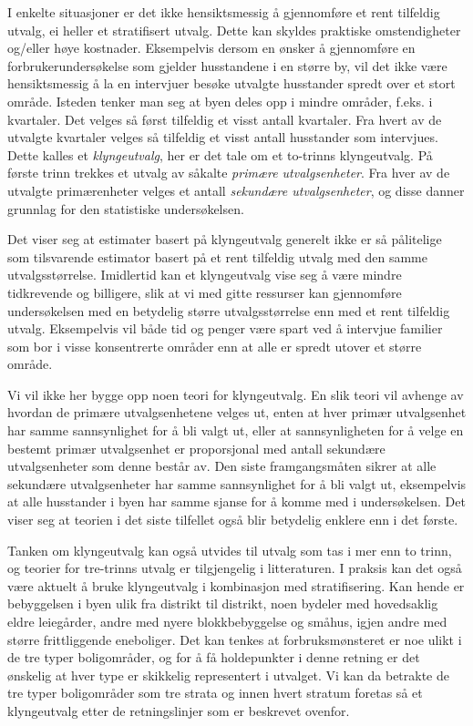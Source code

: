 I enkelte situasjoner er det ikke hensiktsmessig å gjennomføre et
rent tilfeldig utvalg, ei heller et stratifisert utvalg.  Dette kan skyldes
praktiske omstendigheter og/eller høye kostnader.  Eksempelvis dersom en
ønsker å gjennomføre en forbrukerundersøkelse som gjelder 
husstandene i en større by, vil det ikke være hensiktsmessig å la
en intervjuer besøke utvalgte husstander spredt over et stort område.
Isteden tenker man seg at byen deles opp i mindre områder, f.eks. i
kvartaler.  Det velges så først tilfeldig et visst antall kvartaler.
Fra hvert av de utvalgte kvartaler velges så tilfeldig et visst antall
husstander som intervjues.  Dette kalles et {\em klyngeutvalg}, her er det 
tale om et to-trinns klyngeutvalg.  På første trinn trekkes et utvalg
av såkalte {\em primære utvalgsenheter}.  Fra hver av de utvalgte
primærenheter velges et antall {\em sekundære utvalgsenheter}, og
disse danner grunnlag for den statistiske undersøkelsen.

Det viser seg at estimater basert på klyngeutvalg generelt ikke er så
pålitelige som tilsvarende estimator basert på et rent tilfeldig
utvalg med den samme utvalgsstørrelse.  Imidlertid kan et klyngeutvalg
vise seg å være mindre tidkrevende og billigere, slik at vi med
gitte ressurser kan gjennomføre undersøkelsen med en betydelig 
større utvalgsstørrelse enn med et rent tilfeldig utvalg.  Eksempelvis
vil både tid og penger være spart ved å intervjue familier som
bor i visse konsentrerte områder enn at alle er spredt utover et større
område.

Vi vil ikke her bygge opp noen teori for klyngeutvalg.  En slik teori vil 
avhenge av hvordan de primære utvalgsenhetene velges ut, enten at hver 
primær utvalgsenhet har samme sannsynlighet for å bli valgt ut, eller
at sannsynligheten for å velge en bestemt primær utvalgsenhet er
proporsjonal med antall sekundære utvalgsenheter som denne består av.
Den siste framgangsmåten sikrer at alle sekundære utvalgsenheter har 
samme sannsynlighet for å bli valgt ut, eksempelvis at alle husstander i
byen har samme sjanse for å komme med i undersøkelsen.  Det viser seg
at teorien i det siste tilfellet også blir betydelig enklere enn i det 
første.

Tanken om klyngeutvalg kan også utvides til utvalg som tas i mer enn to
trinn, og teorier for tre-trinns utvalg er tilgjengelig i litteraturen.  I
praksis kan det også være aktuelt å bruke klyngeutvalg i
kombinasjon med stratifisering.  Kan hende er bebyggelsen i byen ulik fra
distrikt til distrikt, noen bydeler med hovedsaklig eldre leiegårder,
andre med nyere blokkbebyggelse og småhus, igjen andre med større 
frittliggende eneboliger.  Det kan tenkes at forbruksmønsteret er noe ulikt
i de tre typer boligområder, og for å få holdepunkter i denne 
retning er det ønskelig at hver type er skikkelig representert i utvalget.
Vi kan da betrakte de tre typer boligområder som tre strata og innen hvert
stratum foretas så et klyngeutvalg etter de retningslinjer som er 
beskrevet ovenfor.


